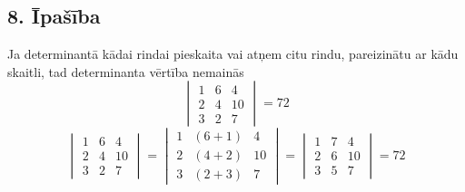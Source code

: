 \documentclass{article}
\begin{document}
\subsection*{8. Īpašība}
Ja determinantā kādai rindai pieskaita vai atņem citu rindu, pareizinātu ar kādu skaitli, tad determinanta vērtība nemainās
\begin{equation*}
    \begin{vmatrix}
        1 & 6 & 4\\
        2 & 4 & 10\\
        3 & 2 & 7
    \end{vmatrix}
    =
    72
\end{equation*}
\begin{equation*}
    \begin{vmatrix}
        1 & 6 & 4\\
        2 & 4 & 10\\
        3 & 2 & 7
    \end{vmatrix}
    =
    \begin{vmatrix}
        1 & (6 + 1) & 4\\
        2 & (4 + 2) & 10\\
        3 & (2 + 3) & 7
    \end{vmatrix}
    =
    \begin{vmatrix}
        1 & 7 & 4\\
        2 & 6 & 10\\
        3 & 5 & 7
    \end{vmatrix}
    =
    72
\end{equation*}
\end{document}
